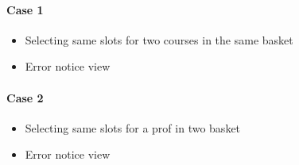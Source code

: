 \documentclass[letterpaper,10pt,english]{sphinxmanual}
\begin{document}
\subsubsection{Case 1}
\label{\detokenize{user_manual:id3}}\begin{itemize}
\item {} 
Selecting same slots for two courses in the same basket

\end{itemize}

\begin{itemize}
\item {} 
Error notice view

\end{itemize}



\subsubsection{Case 2}
\label{\detokenize{user_manual:id4}}\begin{itemize}
\item {} 
Selecting same slots for a prof in two basket

\end{itemize}

\begin{itemize}
\item {} 
Error notice view

\end{itemize}



\chapter{}
\label{\detokenize{developer:developer-manual}}\label{\detokenize{developer::doc}}
\end{document}
